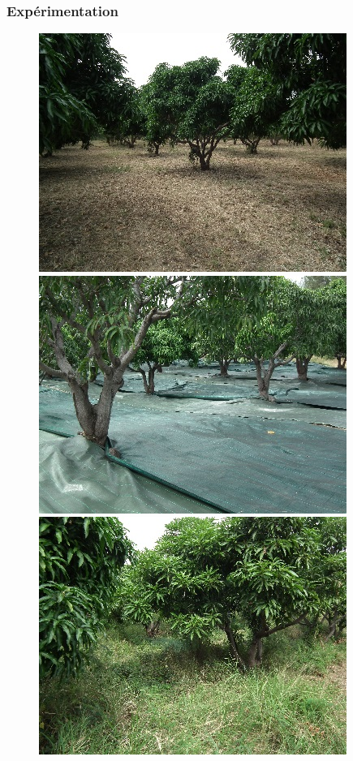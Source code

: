 \documentclass[xcolor={dvipsnames}]{beamer}
\begin{document}
\begin{frame}
 \frametitle{Expérimentation}
 \begin{figure}[ht]
 \centering
 \includegraphics[scale = 0.5]{../photos/er.jpg}
 \includegraphics[scale = 0.5]{../photos/ps.jpg}
 \includegraphics[scale = 0.5]{../photos/eh.jpg}
 
  \vspace{0.3cm}
 

\end{figure}
\end{frame}
\end{document}
